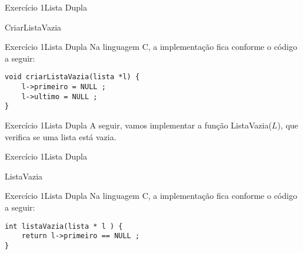 \documentclass[aspectratio=169]{beamer}
\begin{document}

\begin{frame}[fragile]{Exercício 1}{Lista Dupla}
\begin{algorithm}[H]
\caption{CriarListaVazia} 
\label{CriarListaVazia}
\end{algorithm}
\end{frame}


\begin{frame}[fragile]{Exercício 1}{Lista Dupla}
Na linguagem C, a implementação fica conforme o código a seguir:
\begin{lstlisting}[style=CStyle]
void criarListaVazia(lista *l) {
    l->primeiro = NULL ;
    l->ultimo = NULL ;
}
\end{lstlisting}  
\end{frame}



\begin{frame}[fragile]{Exercício 1}{Lista Dupla}
A seguir, vamos implementar a função ListaVazia($L$), que verifica se uma lista está vazia.
\end{frame}


\begin{frame}[fragile]{Exercício 1}{Lista Dupla}
\begin{algorithm}[H]
\caption{ListaVazia} 
\label{ListaVazia}
\end{algorithm}
\end{frame}


\begin{frame}[fragile]{Exercício 1}{Lista Dupla}
Na linguagem C, a implementação fica conforme o código a seguir:
\begin{lstlisting}[style=CStyle]
int listaVazia(lista * l ) {
    return l->primeiro == NULL ;
}
\end{lstlisting}  
\end{frame}
\end{document}
